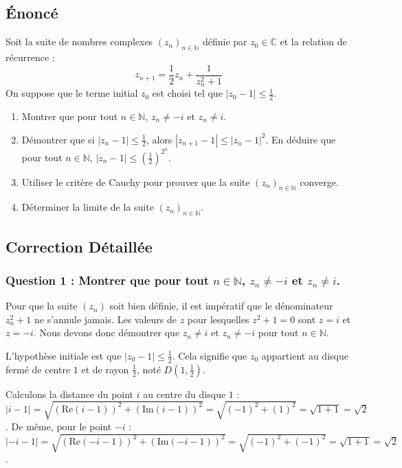 \documentclass[a4paper,11pt]{report}
\begin{document}
\subsection*{Énoncé}
Soit la suite de nombres complexes $(z_n)_{n \in \mathbb{N}}$ définie par $z_0 \in \mathbb{C}$ et la relation de récurrence :
$$z_{n+1} = \frac{1}{2} z_n + \frac{1}{z_n^2+1}$$
On suppose que le terme initial $z_0$ est choisi tel que $|z_0 - 1| \le \frac{1}{2}$.
\begin{enumerate}
\item Montrer que pour tout $n \in \mathbb{N}$, $z_n \neq -i$ et $z_n \neq i$.

\item Démontrer que si $|z_n - 1| \le \frac{1}{2}$, alors $|z_{n+1} - 1| \le |z_n - 1|^2$. En déduire que pour tout $n \in \mathbb{N}$, $|z_n - 1| \le \left(\frac{1}{2}\right)^{2^n}$.

\item Utiliser le critère de Cauchy pour prouver que la suite $(z_n)_{n \in \mathbb{N}}$ converge.

\item Déterminer la limite de la suite $(z_n)_{n \in \mathbb{N}}$.
\end{enumerate}

\subsection*{Correction Détaillée}
\subsubsection*{Question 1 : Montrer que pour tout $n \in \mathbb{N}$, $z_n \neq -i$ et $z_n \neq i$.}

Pour que la suite $(z_n)$ soit bien définie, il est impératif que le dénominateur $z_n^2+1$ ne s'annule jamais. Les valeurs de $z$ pour lesquelles $z^2+1=0$ sont $z=i$ et $z=-i$. Nous devons donc démontrer que $z_n \neq i$ et $z_n \neq -i$ pour tout $n \in \mathbb{N}$.

L'hypothèse initiale est que $|z_0 - 1| \le \frac{1}{2}$. Cela signifie que $z_0$ appartient au disque fermé de centre $1$ et de rayon $\frac{1}{2}$, noté $D(1, \frac{1}{2})$.

Calculons la distance du point $i$ au centre du disque $1$ :
$|i - 1| = \sqrt{(\text{Re}(i-1))^2 + (\text{Im}(i-1))^2} = \sqrt{(-1)^2 + (1)^2} = \sqrt{1+1} = \sqrt{2}$.
De même, pour le point $-i$ :
$|-i - 1| = \sqrt{(\text{Re}(-i-1))^2 + (\text{Im}(-i-1))^2} = \sqrt{(-1)^2 + (-1)^2} = \sqrt{1+1} = \sqrt{2}$.
\end{document}
